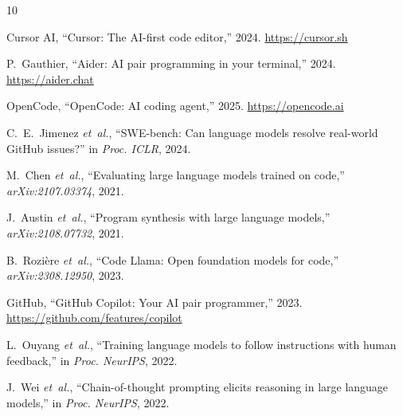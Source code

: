 \documentclass[journal]{IEEEtran}
\begin{document}

\begin{thebibliography}{10}

Cursor AI, ``Cursor: The AI-first code editor,'' 2024.
\url{https://cursor.sh}

P.~Gauthier, ``Aider: AI pair programming in your terminal,'' 2024.
\url{https://aider.chat}

OpenCode, ``OpenCode: AI coding agent,'' 2025.
\url{https://opencode.ai}

C.~E.~Jimenez \textit{et~al.}, ``SWE-bench: Can language models resolve
real-world GitHub issues?'' in \textit{Proc. ICLR}, 2024.

M.~Chen \textit{et~al.}, ``Evaluating large language models trained on
code,'' \textit{arXiv:2107.03374}, 2021.

J.~Austin \textit{et~al.}, ``Program synthesis with large language
models,'' \textit{arXiv:2108.07732}, 2021.

B.~Rozi\`ere \textit{et~al.}, ``Code Llama: Open foundation models for
code,'' \textit{arXiv:2308.12950}, 2023.

GitHub, ``GitHub Copilot: Your AI pair programmer,'' 2023.
\url{https://github.com/features/copilot}

L.~Ouyang \textit{et~al.}, ``Training language models to follow instructions
with human feedback,'' in \textit{Proc. NeurIPS}, 2022.

J.~Wei \textit{et~al.}, ``Chain-of-thought prompting elicits reasoning in
large language models,'' in \textit{Proc. NeurIPS}, 2022.

\end{thebibliography}
\end{document}
